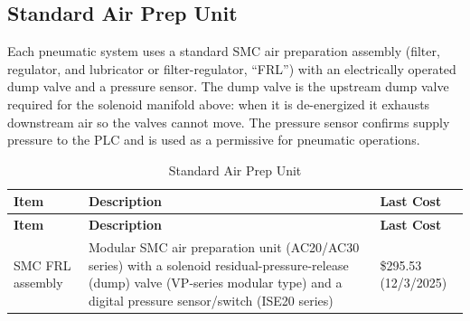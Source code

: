 \subsection{Standard Air Prep Unit}\label{sec:air-prep}
Each pneumatic system uses a standard SMC air preparation assembly (filter, regulator, and lubricator or filter-regulator, ``FRL'') with an electrically operated dump valve and a pressure sensor. The dump valve is the upstream dump valve required for the solenoid manifold above: when it is de-energized it exhausts downstream air so the valves cannot move. The pressure sensor confirms supply pressure to the PLC and is used as a permissive for pneumatic operations.

\begin{longtable}{@{}P{3.68cm}P{10.23cm}P{3.03cm}@{}}
\caption{Standard Air Prep Unit}\label{tab:air-prep} \\
\toprule
{}\textbf{Item} & \textbf{Description} & \textbf{Last Cost} \\
\midrule
\endfirsthead
\toprule
{}\textbf{Item} & \textbf{Description} & \textbf{Last Cost} \\
\midrule
\endhead
SMC FRL assembly \chk{} & Modular SMC air preparation unit (AC20/AC30 series) with a solenoid residual-pressure-release (dump) valve (VP-series modular type) and a digital pressure sensor/switch (ISE20 series) & \$295.53 (12/3/2025) \\
\bottomrule
\end{longtable}

